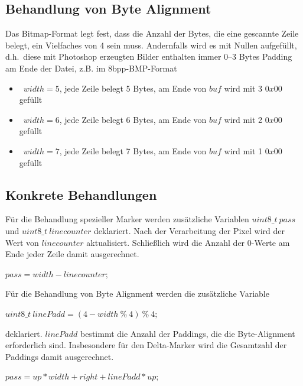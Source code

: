 \documentclass[course=erap]{aspdoc}
\begin{document}
    \subsection{Behandlung von Byte Alignment}\label{subsec:behandlung-von-byte-alignment}
    Das Bitmap-Format legt fest, dass die Anzahl der Bytes, die eine gescannte Zeile belegt, ein Vielfaches von 4 sein
    muss.
    \newline
    \newline
    Andernfalls wird es mit Nullen aufgefüllt\cite{bitmapPadding},
    d.h.\ diese mit Photoshop erzeugten Bilder enthalten immer 0--3 Bytes Padding am Ende der Datei, z.B\@.
    \newline
    \newline
    im 8bpp-BMP-Format
    \begin{itemize}
        \item \ $width = 5$, jede Zeile belegt 5 Bytes, am Ende von $buf$ wird mit 3 $0x00$ gefüllt
        \item \ $width = 6$, jede Zeile belegt 6 Bytes, am Ende von $buf$ wird mit 2 $0x00$ gefüllt
        \item \ $width = 7$, jede Zeile belegt 7 Bytes, am Ende von $buf$ wird mit 1 $0x00$ gefüllt
    \end{itemize}

    \subsection{Konkrete Behandlungen}\label{subsec:konkrete-behandlungen}
    Für die Behandlung spezieller Marker werden zusätzliche Variablen
    $uint8\_t \ pass$ und $uint8\_t \ linecounter$ deklariert.
    \newline
    \newline
    Nach der Verarbeitung der Pixel wird der Wert von $linecounter$ aktualisiert.
    Schließlich wird die Anzahl der 0-Werte am Ende jeder Zeile damit ausgerechnet.
    \begin{center}
        $pass = width - linecounter;$
    \end{center}
    \noindent Für die Behandlung von Byte Alignment werden die zusätzliche Variable
    \begin{center}
        $uint8\_t \ linePadd = (4 - width \ \% \ 4) \ \% \ 4;$
    \end{center}
    deklariert.
    $linePadd$ bestimmt die Anzahl der Paddings, die die Byte-Alignment erforderlich sind.
    \newline
    \newline
    Insbesondere für den Delta-Marker wird die Gesamtzahl der Paddings damit ausgerechnet.
    \begin{center}
        $pass = up * width + right + linePadd * up;$
    \end{center}
\end{document}
